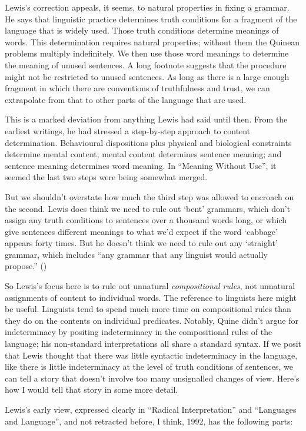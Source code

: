 \documentclass[
  10pt,
  letterpaper,
  DIV=11,
  numbers=noendperiod,
  twoside]{scrartcl}
\begin{document}
Lewis's correction appeals, it seems, to natural properties in fixing a
grammar. He says that linguistic practice determines truth conditions
for a fragment of the language that is widely used. Those truth
conditions determine meanings of words. This determination requires
natural properties; without them the Quinean problems multiply
indefinitely. We then use those word meanings to determine the meaning
of unused sentences. A long footnote suggests that the procedure might
not be restricted to unused sentences. As long as there is a large
enough fragment in which there are conventions of truthfulness and
trust, we can extrapolate from that to other parts of the language that
are used.

This is a marked deviation from anything Lewis had said until then. From
the earliest writings, he had stressed a step-by-step approach to
content determination. Behavioural dispositions plus physical and
biological constraints determine mental content; mental content
determines sentence meaning; and sentence meaning determines word
meaning. In ``Meaning Without Use'', it seemed the last two steps were
being somewhat merged.

But we shouldn't overstate how much the third step was allowed to
encroach on the second. Lewis does think we need to rule out `bent'
grammars, which don't assign any truth conditions to sentences over a
thousand words long, or which give sentences different meanings to what
we'd expect if the word `cabbage' appears forty times. But he doesn't
think we need to rule out any `straight' grammar, which includes ``any
grammar that any linguist would actually propose.''
()

So Lewis's focus here is to rule out unnatural \emph{compositional
rules}, not unnatural assignments of content to individual words. The
reference to linguists here might be useful. Linguists tend to spend
much more time on compositional rules than they do on the contents on
individual predicates. Notably, Quine didn't argue for indeterminacy by
positing indeterminacy in the compositional rules of the language; his
non-standard interpretations all share a standard syntax. If we posit
that Lewis thought that there was little syntactic indeterminacy in the
language, like there is little indeterminacy at the level of truth
conditions of sentences, we can tell a story that doesn't involve too
many unsignalled changes of view. Here's how I would tell that story in
some more detail.

Lewis's early view, expressed clearly in ``Radical Interpretation'' and
``Languages and Language'', and not retracted before, I think, 1992, has
the following parts:
\end{document}
